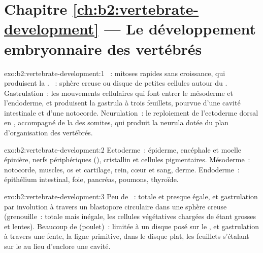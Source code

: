 \section*{Chapitre \ref{ch:b2:vertebrate-development} --- Le développement embryonnaire des vertébrés}

\begin{solution}{exo:b2:vertebrate-development:1}
~: mitoses rapides sans croissance, qui produisent la
. ~: sphère creuse ou disque de petites cellules autour
du . Gastrulation~: les mouvements cellulaires qui font entrer
le mésoderme et l'endoderme, et produisent la gastrula à trois feuillets,
pourvue d'une cavité intestinale et d'une notocorde. Neurulation~: le
reploiement de l'ectoderme dorsal en , accompagné de la
 des somites, qui produit la neurula dotée du plan
d'organisation des vertébrés.
\end{solution}

\begin{solution}{exo:b2:vertebrate-development:2}
Ectoderme~: épiderme, encéphale et moelle épinière, nerfs périphériques
(), cristallin et cellules pigmentaires. Mésoderme~:
notocorde, muscles, os et cartilage, rein, cœur et sang, derme.
Endoderme~: épithélium intestinal, foie, pancréas, poumons, thyroïde.
\end{solution}

\begin{solution}{exo:b2:vertebrate-development:3}
Peu de ~:  totale et presque égale, et gastrulation
par involution à travers un blastopore circulaire dans une sphère creuse
(grenouille~:  totale mais inégale, les cellules végétatives
chargées de  étant grosses et lentes). Beaucoup de 
(poulet)~:  limitée à un disque posé sur le , et
gastrulation à travers une fente, la ligne primitive, dans le disque
plat, les feuillets s'étalant sur le  au lieu d'enclore une
cavité.
\end{solution}

